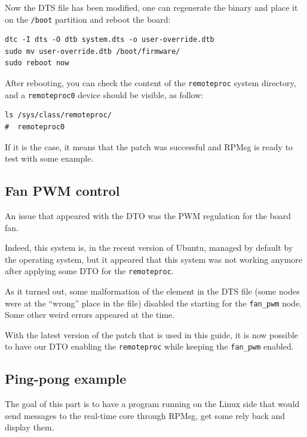 \documentclass[10pt]{article}
\begin{document}
Now the DTS file has been modified, one can regenerate the binary and place it on the \verb|/boot| partition
and reboot the board:
\begin{tcolorbox}
\begin{verbatim}
dtc -I dts -O dtb system.dts -o user-override.dtb
sudo mv user-override.dtb /boot/firmware/
sudo reboot now
\end{verbatim}
\end{tcolorbox}

After rebooting, you can check the content of the \verb|remoteproc| system directory,
and a \verb|remoteproc0| device should be visible, as follow:
\begin{tcolorbox}
\begin{verbatim}
ls /sys/class/remoteproc/
#  remoteproc0
\end{verbatim}
\end{tcolorbox}

If it is the case, it means that the patch was successful and RPMsg is
ready to test with some example.

\subsection{Fan PWM control}
\label{sec:fan-pwm-control}
An issue that appeared with the DTO was the PWM regulation for the board fan.

Indeed, this system is, in the recent version of Ubuntu, managed by default
by the operating system, but it appeared that this system was not working anymore
after applying some DTO for the \verb|remoteproc|.

As it turned out, some malformation of the element in the DTS file (some nodes were
at the ``wrong'' place in the file) disabled the starting for the \verb|fan_pwm|
node. Some other weird errors appeared at the time.

With the latest version of the patch that is used in this guide, it is now
possible to have our DTO enabling the \verb|remoteproc| while keeping
the \verb|fan_pwm| enabled.




\subsection{Ping-pong example}
\label{sec:ping-pong-example}
The goal of this part is to have a program running on the Linux side that would
send messages to the real-time core through RPMsg, get some rely back and display
them.
\end{document}
